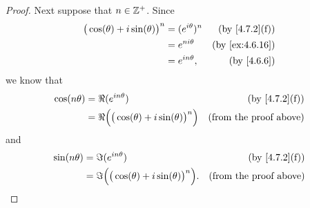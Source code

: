 \begin{proof}
  Next suppose that \(n \in \mathbb{Z}^+\).
  Since
  \begin{align*}
    \big(\cos(\theta) + i \sin(\theta)\big)^n & = (e^{i \theta})^n & \text{(by \cref{4.7.2}(f))}  \\
                                              & = e^{n i \theta}   & \text{(by \cref{ex:4.6.16})} \\
                                              & = e^{i n \theta},  & \text{(by \cref{4.6.6})}
  \end{align*}
  we know that
  \begin{align*}
    \cos(n \theta) & = \Re(e^{i n \theta})                                    & \text{(by \cref{4.7.2}(f))}   \\
                   & = \Re\Big(\big(\cos(\theta) + i \sin(\theta)\big)^n\Big) & \text{(from the proof above)}
  \end{align*}
  and
  \begin{align*}
    \sin(n \theta) & = \Im(e^{i n \theta})                                     & \text{(by \cref{4.7.2}(f))}   \\
                   & = \Im\Big(\big(\cos(\theta) + i \sin(\theta)\big)^n\Big). & \text{(from the proof above)}
  \end{align*}


\end{proof}
